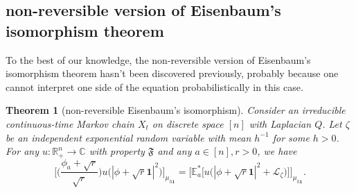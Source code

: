 \documentclass[a4paper, 11pt]{article}
\newcommand{\E}{\mathbb{E}}
\newcommand{\allone}{\mathbf{1}}
\newcommand{\Ell}{\mathcal{L}}
\newcommand{\orthp}{{\mathbb{R}_+^n}}
\newtheorem{thm}{Theorem}[section]
\begin{document}
\subsection{non-reversible version of Eisenbaum's isomorphism theorem}

To the best of our knowledge, the non-reversible version of Eisenbaum's isomorphism theorem hasn't been discovered previously, probably because one cannot interpret one side of the equation probabilistically in this case.

\vspace{.3em} \begin{thm}[non-reversible Eisenbaum's isomorphism]
\label{thm:eisenbaum}
Consider an irreducible continuous-time Markov chain $X_t$ on discrete space $[n]$ with Laplacian $Q$. Let $\zeta$ be an independent exponential random variable with mean $h^{-1}$ for some $h>0$. For any $ u:\orthp\rightarrow \mathbb{C}$ with property $\mathfrak{F}$ and any $a\in [n], r>0$, we have
\[
\bigg[ \bigg(\frac{\phi_a+\sqrt{r}}{\sqrt{r}}\bigg) u\big(|\phi+\sqrt{r}\allone|^2\big)\bigg]_{\mu_{h\allone}}
= \big[\E_a^*\big[ u\big(|\phi+\sqrt{r}\allone|^2+\Ell_\zeta\big)\big]\big]_{\mu_{h\allone}}.\]
\end{thm}
\end{document}
